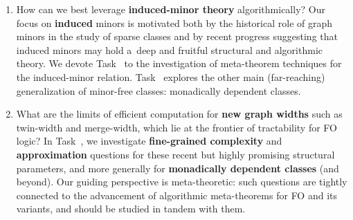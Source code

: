 \documentclass[a4paper,11pt]{article}
\newcommand{\fo}{\textsf{FO}\xspace}
\newcommand{\giannos}[1]{\noindent{\bf {\color{violet}{\sc Giannos:}  #1}}}
\begin{document}
\begin{enumerate}
\item How can we best leverage \textbf{induced-minor theory} algorithmically?
Our focus on \textbf{induced} minors is motivated both by the historical role of graph minors in the study of sparse classes and by recent progress suggesting that induced minors may hold a~deep and fruitful structural and algorithmic theory.
We devote Task~ to the investigation of meta-theorem techniques for the induced-minor relation.
Task~ explores the other main (far-reaching) generalization of minor-free classes: monadically dependent classes.


\item What are the limits of efficient computation for \textbf{new graph widths} such as twin-width and merge-width, which lie at the frontier of tractability for \fo logic?
In Task~, we investigate \textbf{fine-grained complexity} and \textbf{approximation} questions for these recent but highly promising structural parameters, and more generally for \textbf{monadically dependent classes} (and beyond).
Our guiding perspective is meta-theoretic: such questions are tightly connected to the advancement of algorithmic meta-theorems for \fo and its variants, and should be studied in tandem with them.


\end{enumerate}
\end{document}
